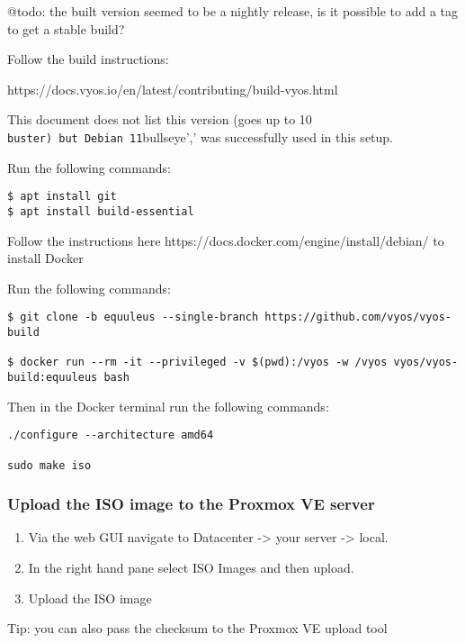 @todo: the built version seemed to be a nightly release, is it possible
to add a tag to get a stable build?

Follow the build instructions:

https://docs.vyos.io/en/latest/contributing/build-vyos.html

This document does not list this version (goes up to 10
\texttt{buster\textquotesingle{}\textquotesingle{})\ but\ Debian\ 11}bullseye','
was successfully used in this setup.

Run the following commands:

\begin{verbatim}
$ apt install git
$ apt install build-essential
\end{verbatim}

Follow the instructions here
https://docs.docker.com/engine/install/debian/ to install Docker

Run the following commands:

\begin{verbatim}
$ git clone -b equuleus --single-branch https://github.com/vyos/vyos-build

$ docker run --rm -it --privileged -v $(pwd):/vyos -w /vyos vyos/vyos-build:equuleus bash
\end{verbatim}

Then in the Docker terminal run the following commands:

\begin{verbatim}
./configure --architecture amd64

sudo make iso
\end{verbatim}

\hypertarget{upload-the-iso-image-to-the-proxmox-ve-server}{%
\subsubsection{Upload the ISO image to the Proxmox VE
server}\label{upload-the-iso-image-to-the-proxmox-ve-server}}

\begin{enumerate}
\def\labelenumi{\arabic{enumi}.}
\item
  Via the web GUI navigate to Datacenter -\textgreater{} your server
  -\textgreater{} local.
\item
  In the right hand pane select ISO Images and then upload.
\item
  Upload the ISO image
\end{enumerate}

Tip: you can also pass the checksum to the Proxmox VE upload tool

